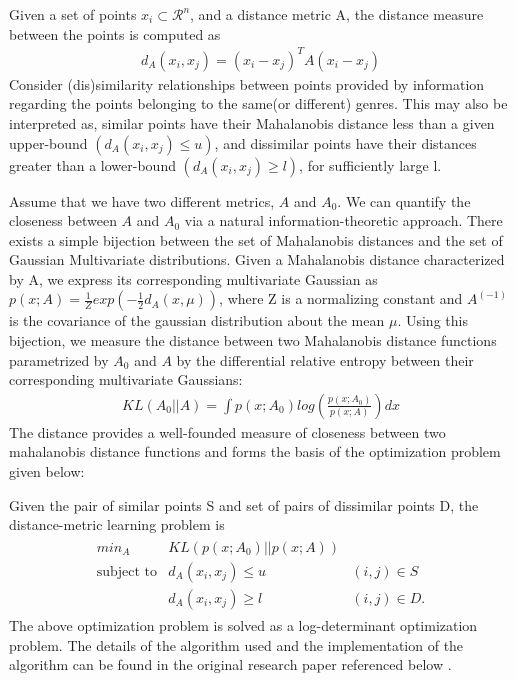 \documentclass[10pt]{article}
\begin{document}
Given a set of points ${x_i} \subset \mathcal{R}^n$, and a distance metric A, the distance measure between the points is computed as
\begin{align*}
d_A(x_i,x_j) = (x_i - x_j)^TA(x_i - x_j)
\end{align*}Consider (dis)similarity relationships between points provided by information regarding the points belonging to the same(or different) genres. This may also be interpreted as, similar points have their Mahalanobis distance less than a given upper-bound $(d_A(x_i,x_j) \leq u)$, and dissimilar points have their distances greater than a lower-bound $(d_A(x_i,x_j) \geq l)$, for sufficiently large l. 

Assume that we have two different metrics, $A$ and $A_0$. We can quantify the closeness between $A$ and $A_0$ via a natural information-theoretic approach. There exists a simple bijection between the set of Mahalanobis distances and the set of Gaussian Multivariate distributions. Given a Mahalanobis distance characterized by A, we express its corresponding multivariate Gaussian as $p(x;A) = \frac{1}{Z} exp( - \frac{1}{2}d_A(x,\mu))$, where Z is a normalizing constant and $A^(-1)$ is the covariance of the gaussian distribution about the mean $\mu$. Using this bijection, we measure the distance between two Mahalanobis distance functions parametrized by $A_0$ and $A$ by the differential relative entropy between their corresponding multivariate Gaussians:
\begin{align}
KL(A_0||A) = \int p(x;A_0) log( \frac{p(x;A_0)}{p(x;A)}) dx
\end{align}
The distance provides a well-founded measure of closeness between two mahalanobis distance functions and forms the basis  of the optimization problem given below:

Given the pair of similar points S and set of pairs of dissimilar points D, the distance-metric learning problem is
\begin{align}
\begin{array}{ccc}
min_A &  KL(p(x;A_0)||p(x;A))& \\
\text{subject to} & d_A(x_i, x_j) \leq u & (i,j) \in S\\
 & d_A(x_i, x_j) \geq l & (i,j) \in D.
\end{array}
\end{align}
The above optimization problem is solved as a log-determinant optimization problem. The details of the algorithm used and the implementation of the algorithm can be found in the original research paper referenced below \cite{infoTheoryMetricLearning}.
\end{document}
